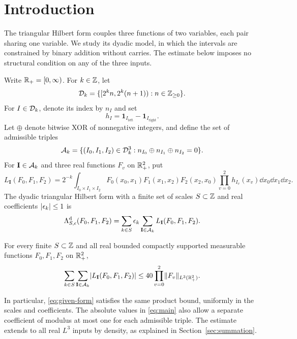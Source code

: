 \section{Introduction}\label{sec:introduction}

The triangular Hilbert form couples three functions of two variables,
each pair sharing one variable. We study its dyadic model, in which the
intervals are constrained by binary addition without carries. The
estimate below imposes no structural condition on any of the three
inputs.

Write \(\mathbb R_+=[0,\infty)\). For \(k\in\mathbb Z\), let
\[
 \mathcal D_k=\{[2^kn,2^k(n+1)):n\in\mathbb Z_{\ge0}\}.
\]
For \(I\in\mathcal D_k\), denote its index by \(n_I\) and set
\[
 h_I=\mathbf1_{I_{\mathrm{left}}}-\mathbf1_{I_{\mathrm{right}}}.
\]
Let \(\oplus\) denote bitwise XOR of nonnegative integers, and define
the set of admissible triples
\[
 \mathcal A_k=\{(I_0,I_1,I_2)\in\mathcal D_k^3:
                  n_{I_0}\oplus n_{I_1}\oplus n_{I_2}=0\}.
\]
For \(\mathbf I\in\mathcal A_k\) and three real functions \(F_v\) on
\(\mathbb R_+^2\), put
\begin{equation}\label{eq:local-form}
 L_{\mathbf I}(F_0,F_1,F_2)
 =2^{-k}\int_{I_0\times I_1\times I_2}
 F_0(x_0,x_1)F_1(x_1,x_2)F_2(x_2,x_0)
 \prod_{v=0}^2 h_{I_v}(x_v)\dd x_0\dd x_1\dd x_2.
\end{equation}
The dyadic triangular Hilbert form with a finite set of scales
\(S\subset\mathbb Z\) and real coefficients \(\lvert \epsilon_k\rvert\le1\) is
\begin{equation}\label{eq:given-form}
 \Lambda^{\mathrm d}_{S,\epsilon}(F_0,F_1,F_2)
 =\sum_{k\in S}\epsilon_k\sum_{\mathbf I\in\mathcal A_k}
                  L_{\mathbf I}(F_0,F_1,F_2).
\end{equation}

\begin{theorem}\label{thm:main}
For every finite \(S\subset\mathbb Z\) and all real bounded compactly
supported measurable functions \(F_0,F_1,F_2\) on \(\mathbb R_+^2\),
\begin{equation}\label{eq:main}
 \sum_{k\in S}\sum_{\mathbf I\in\mathcal A_k}
       \lvert L_{\mathbf I}(F_0,F_1,F_2)\rvert
 \le 40\prod_{v=0}^2\lVert F_v\rVert_{L^3(\mathbb R_+^2)}.
\end{equation}
\end{theorem}

In particular, \eqref{eq:given-form} satisfies the same product bound,
uniformly in the scales and coefficients. The absolute values in
\eqref{eq:main} also allow a separate coefficient of modulus at most one
for each admissible triple. The estimate extends to all real \(L^3\)
inputs by density, as explained in Section~\ref{sec:summation}.

